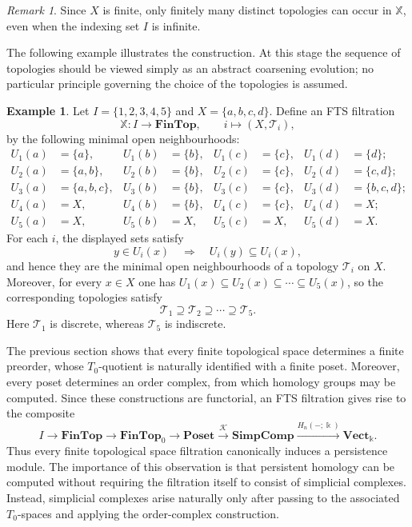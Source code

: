 \documentclass[a4paper,11pt]{article}
\theoremstyle{definition}
\newtheorem{example}[example]{Example}
\theoremstyle{remark}
\newtheorem{remark}[remark]{Remark}
\begin{document}
\begin{remark}
  Since $X$ is finite, only finitely many distinct topologies can occur in $\mathbb X$, even when the indexing set $I$ is infinite.
\end{remark}

The following example illustrates the construction. At this stage the sequence of topologies should be viewed simply as an abstract coarsening evolution; no particular principle governing the choice of the topologies is assumed.

\begin{example}\label{ex:abstract_filtration}
Let $I=\{1,2,3,4,5\}$ and $X=\{a,b,c,d\}$. Define an FTS filtration
$$
\mathbb X\colon I\longrightarrow\mathbf{FinTop},\qquad i\longmapsto (X,\mathcal T_i),
$$
by the following minimal open neighbourhoods:
\begin{align*}
U_1(a) &=\{a\},     & U_1(b) &=\{b\}, & U_1(c) &=\{c\},   & U_1(d) & =\{d\};\\
U_2(a) &=\{a,b\},   & U_2(b) &=\{b\}, & U_2(c) &=\{c\},   & U_2(d) &=\{c,d\};\\
U_3(a) &=\{a,b,c\}, & U_3(b) &=\{b\}, & U_3(c) &=\{c\},   & U_3(d) &=\{b,c,d\};\\
U_4(a) &=X,         & U_4(b) &=\{b\}, & U_4(c) &=\{c\},   & U_4(d) &=X;\\
U_5(a) &=X,         & U_5(b) &=X,     & U_5(c) &=X,       & U_5(d) &=X.
\end{align*}
For each $i$, the displayed sets satisfy
$$
y\in U_i(x)\quad\Longrightarrow\quad U_i(y)\subseteq U_i(x),
$$
and hence they are the minimal open neighbourhoods of a topology $\mathcal T_i$ on $X$. Moreover, for every $x\in X$ one has $U_1(x)\subseteq U_2(x)\subseteq\cdots\subseteq U_5(x)$, so the corresponding topologies satisfy
$$
\mathcal T_1\supseteq\mathcal T_2\supseteq\cdots\supseteq\mathcal T_5.
$$
Here $\mathcal T_1$ is discrete, whereas $\mathcal T_5$ is indiscrete.
\end{example}

The previous section shows that every finite topological space determines a finite preorder, whose $T_0$-quotient is naturally identified with a finite poset. Moreover, every poset determines an order complex, from which homology groups may be computed. Since these constructions are functorial, an FTS filtration gives rise to the composite
$$ I\longrightarrow \mathbf{FinTop}\longrightarrow \mathbf{FinTop}_0\longrightarrow \mathbf{Poset}\overset{\mathcal{K}}{\longrightarrow} \mathbf{SimpComp}\overset{H_n(-;\Bbbk)}{\longrightarrow} \mathbf{Vect}_{\Bbbk}. $$
Thus every finite topological space filtration canonically induces a persistence module. The importance of this observation is that persistent homology can be computed without requiring the filtration itself to consist of simplicial complexes. Instead, simplicial complexes arise naturally only after passing to the associated $T_0$-spaces and applying the order-complex construction.
\end{document}

